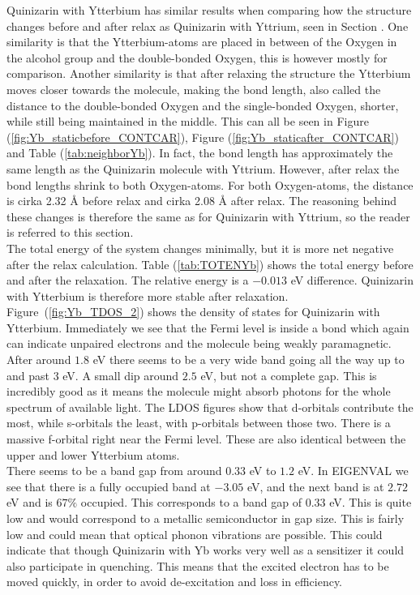 \documentclass{article}
\begin{document}
    Quinizarin with Ytterbium has similar results when comparing how the structure changes before and after relax as Quinizarin with Yttrium, seen in Section . One similarity is that the Ytterbium-atoms are placed in between of the Oxygen in the alcohol group and the double-bonded Oxygen, this is however mostly for comparison. Another similarity is that after relaxing the structure the Ytterbium moves closer towards the molecule, making the bond length, also called the distance to the double-bonded Oxygen and the single-bonded Oxygen, shorter, while still being maintained in the middle. This can all be seen in Figure (\ref{fig:Yb_staticbefore_CONTCAR}), Figure (\ref{fig:Yb_staticafter_CONTCAR}) and Table (\ref{tab:neighborYb}). In fact, the bond length has approximately the same length as the Quinizarin molecule with Yttrium. However, after relax the bond lengths shrink to both Oxygen-atoms. For both Oxygen-atoms, the distance is cirka 2.32 Å before relax and cirka 2.08 Å after relax. The reasoning behind these changes is therefore the same as for Quinizarin with Yttrium, so the reader is referred to this section. \\

    The total energy of the system changes minimally, but it is more net negative after the relax calculation. Table (\ref{tab:TOTENYb}) shows the total energy before and after the relaxation. The relative energy is a $-0.013$ eV difference. Quinizarin with Ytterbium is therefore more stable after relaxation. \\

    Figure~(\ref{fig:Yb_TDOS_2}) shows the density of states for Quinizarin with Ytterbium. Immediately we see that the Fermi level is inside a bond which again can indicate unpaired electrons and the molecule being weakly paramagnetic. After around $1.8$ eV there seems to be a very wide band going all the way up to and past $3$ eV. A small dip around $2.5$ eV, but not a complete gap. This is incredibly good as it means the molecule might absorb photons for the whole spectrum of available light. The LDOS figures show that d-orbitals contribute the most, while s-orbitals the least, with p-orbitals between those two. There is a massive f-orbital right near the Fermi level. These are also identical between the upper and lower Ytterbium atoms. \\

    There seems to be a band gap from around $0.33$ eV to $1.2$ eV. In EIGENVAL we see that there is a fully occupied band at $-3.05$ eV, and the next band is at $2.72$ eV and is $67\%$ occupied. This corresponds to a band gap of $0.33$ eV. This is quite low and would correspond to a metallic semiconductor in gap size. This is fairly low and could mean that optical phonon vibrations are possible. This could indicate that though Quinizarin with Yb works very well as a sensitizer it could also participate in quenching. This means that the excited electron has to be moved quickly, in order to avoid de-excitation and loss in efficiency. \\
\end{document}
